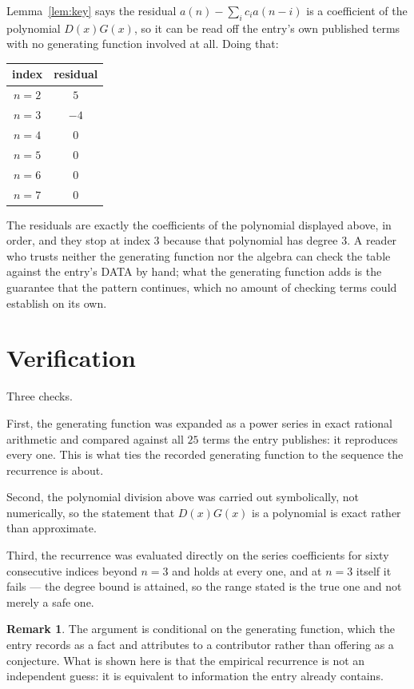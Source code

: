 \documentclass[11pt,a4paper]{article}
\theoremstyle{plain}
\theoremstyle{definition}
\newtheorem{remark}[theorem]{Remark}
\begin{document}
Lemma~\ref{lem:key} says the residual $a(n)-\sum_ic_ia(n-i)$ is a coefficient of the
polynomial $D(x)G(x)$, so it can be read off the entry's own published terms with no
generating function involved at all. Doing that:
\begin{center}
\begin{tabular}{cc}
index & residual \\ \hline
$n=2$ & $5$ \\
$n=3$ & $-4$ \\
$n=4$ & $0$ \\
$n=5$ & $0$ \\
$n=6$ & $0$ \\
$n=7$ & $0$
\end{tabular}
\end{center}
The residuals are exactly the coefficients of the polynomial displayed above, in order, and
they stop at index $3$ because that polynomial has degree $3$. A reader who trusts
neither the generating function nor the algebra can check the table against the entry's DATA
by hand; what the generating function adds is the guarantee that the pattern continues, which
no amount of checking terms could establish on its own.

\section{Verification}

Three checks.

First, the generating function was expanded as a power series in exact rational arithmetic and
compared against all $25$ terms the entry publishes: it reproduces every one. This is
what ties the recorded generating function to the sequence the recurrence is about.

Second, the polynomial division above was carried out symbolically, not numerically, so the
statement that $D(x)G(x)$ is a polynomial is exact rather than approximate.

Third, the recurrence was evaluated directly on the series coefficients for sixty consecutive
indices beyond $n=3$ and holds at every one, and at $n=3$ itself it fails --- the
degree bound is attained, so the range stated is the true one and not merely a safe one.

\begin{remark}
The argument is conditional on the generating function, which the entry records as a fact and
attributes to a contributor rather than offering as a conjecture. What is shown here is that
the empirical recurrence is not an independent guess: it is equivalent to information the
entry already contains.
\end{remark}
\end{document}
